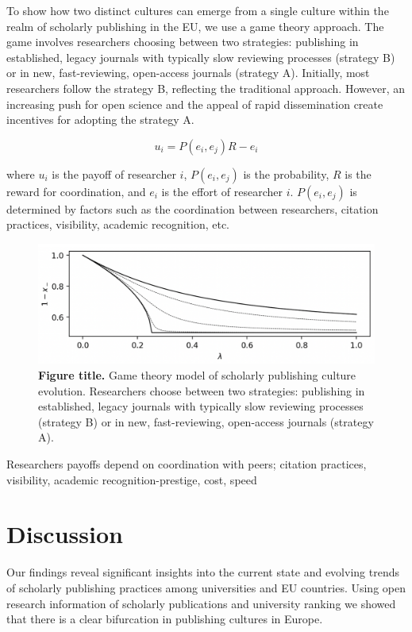 \documentclass[amsfonts, amssymb, prl, superscriptaddress, notitlepage, twocolumn, nofootinbib]{revtex4-2}
\begin{document}
To show how two distinct cultures can emerge from a single culture within the realm of scholarly publishing in the EU, we use a game theory approach. The game involves researchers choosing between two strategies: publishing in established, legacy journals with typically slow reviewing processes (strategy B) or in new, fast-reviewing, open-access journals (strategy A). Initially, most researchers follow the strategy B, reflecting the traditional approach. However, an increasing push for open science and the appeal of rapid dissemination create incentives for adopting the strategy A. 

\begin{equation}
    u_i = P(e_i, e_j)R - e_i
\end{equation}

where $u_i$ is the payoff of researcher $i$, $P(e_i, e_j)$ is the probability, $R$ is the reward for coordination, and $e_i$ is the effort of researcher $i$. $P(e_i, e_j)$ is determined by factors such as the coordination between researchers, citation practices, visibility, academic recognition, etc.

\begin{figure}
    \centering
    \includegraphics[width=1.0\linewidth]{Fig07.png}
    \caption{\label{fig:fig7} {\bf Figure title.} Game theory model of scholarly publishing culture evolution. Researchers choose between two strategies: publishing in established, legacy journals with typically slow reviewing processes (strategy B) or in new, fast-reviewing, open-access journals (strategy A). 
}
\end{figure}

Researchers payoffs depend on coordination with peers; citation practices, visibility, academic recognition-prestige, cost, speed  




\section{Discussion}
Our findings reveal significant insights into the current state and evolving trends of scholarly publishing practices among universities and EU countries. Using open research information of scholarly publications and university ranking we showed that there is a clear bifurcation in publishing cultures in Europe. 
\end{document}
